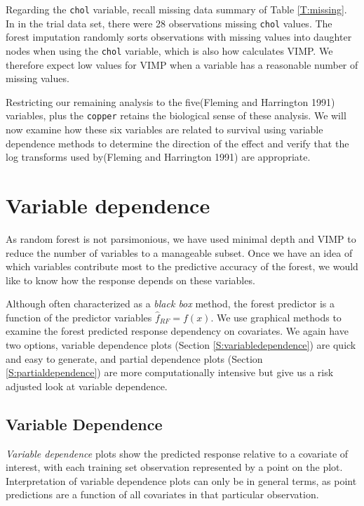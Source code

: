 \documentclass[article]{jss}
\begin{document}
Regarding the \texttt{chol} variable, recall missing data summary of
Table \ref{T:missing}. In in the trial data set, there were 28
observations missing \texttt{chol} values. The forest imputation
randomly sorts observations with missing values into daughter nodes when
using the \texttt{chol} variable, which is also how
 calculates VIMP. We therefore expect low values
for VIMP when a variable has a reasonable number of missing values.

Restricting our remaining analysis to the five(Fleming and Harrington
1991) variables, plus the \texttt{copper} retains the biological sense
of these analysis. We will now examine how these six variables are
related to survival using variable dependence methods to determine the
direction of the effect and verify that the log transforms used
by(Fleming and Harrington 1991) are appropriate.

\section{Variable dependence}\label{variable-dependence}

As random forest is not parsimonious, we have used minimal depth and
VIMP to reduce the number of variables to a manageable subset. Once we
have an idea of which variables contribute most to the predictive
accuracy of the forest, we would like to know how the response depends
on these variables.

Although often characterized as a \emph{black box} method, the forest
predictor is a function of the predictor variables
\(\hat{f}_{RF} = f(x).\) We use graphical methods to examine the forest
predicted response dependency on covariates. We again have two options,
variable dependence plots (Section \ref{S:variabledependence}) are quick
and easy to generate, and partial dependence plots (Section
\ref{S:partialdependence}) are more computationally intensive but give
us a risk adjusted look at variable dependence.

\subsection{Variable Dependence}\label{variable-dependence-1}

\emph{Variable dependence} plots show the predicted response relative to
a covariate of interest, with each training set observation represented
by a point on the plot. Interpretation of variable dependence plots can
only be in general terms, as point predictions are a function of all
covariates in that particular observation.
\end{document}
